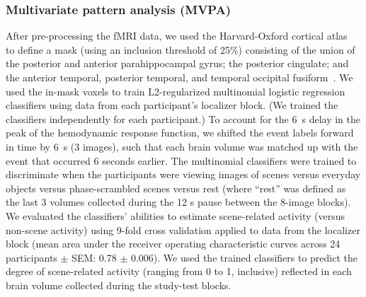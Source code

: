 \documentclass[11pt]{article}
\begin{document}
\subsubsection*{Multivariate pattern analysis (MVPA)}
After pre-processing the fMRI data, we used the Harvard-Oxford
cortical atlas~\citep{DesiEtal06}
to define a mask (using an inclusion threshold of 25\%) consisting of
the union of the posterior and anterior parahippocampal gyrus; the
posterior cingulate; and the anterior temporal, posterior temporal,
and temporal occipital fusiform~\citep[this mask was intended to
encompass the parahippocampal place area and retrosplenial cortex, as
these regions have been previously implicated in scene
processing;][]{EpstEtal99}. We used the in-mask voxels to
train L2-regularized multinomial logistic regression classifiers using
data from each participant's localizer block.  (We trained the
classifiers independently for each participant.)  To account for the
6~s delay in the peak of the hemodynamic response function, we shifted
the event labels forward in time by 6~s (3 images), such that each
brain volume was matched up with the event that occurred 6 seconds
earlier.  The multinomial classifiers were trained to discriminate
when the participants were viewing images of scenes versus everyday
objects versus phase-scrambled scenes versus rest (where ``rest'' was
defined as the last 3 volumes collected during the 12 s pause between
the 8-image blocks).  We evaluated the classifiers' abilities to
estimate scene-related activity (versus non-scene activity) using
9-fold cross validation applied to data from the localizer block (mean
area under the receiver operating characteristic curves across 24
participants $\pm$ SEM: 0.78 $\pm$ 0.006).  We used the trained
classifiers to predict the degree of scene-related activity (ranging
from 0 to 1, inclusive) reflected in each brain volume collected
during the study-test blocks.
\end{document}
